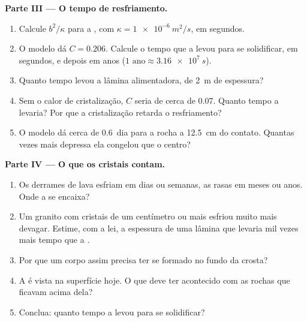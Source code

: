 \begin{problem}
\medskip
\noindent\textbf{Parte III --- O tempo de resfriamento.}
\begin{enumerate}[resume]
  \item Calcule $b^2/\kappa$ para a , com $\kappa = \qty{1e-6}{m^2/s}$,
        em segundos.
  \item O modelo dá $C = 0.206$. Calcule o tempo que a  levou para se solidificar, em
        segundos, e depois em anos ($\num{1}\text{ ano} \approx \qty{3.16e7}{s}$).
  \item Quanto tempo levou a lâmina alimentadora, de \qty{2}{m} de espessura?
  \item Sem o calor de cristalização, $C$ seria de cerca de $0.07$. Quanto
        tempo a  levaria? Por que a cristalização retarda o
        resfriamento?
  \item O modelo dá cerca de \num{0.6}~dia para a rocha a \qty{12.5}{cm} do
        contato. Quantas vezes mais depressa ela congelou que o centro?
\end{enumerate}

\medskip
\noindent\textbf{Parte IV --- O que os cristais contam.}
\begin{enumerate}[resume]
  \item Os derrames de lava esfriam em dias ou semanas, as  rasas
        em meses ou anos. Onde a  se encaixa?
  \item Um granito com cristais de um centímetro ou mais esfriou muito mais
        devagar. Estime, com a lei, a espessura de uma lâmina que levaria mil
        vezes mais tempo que a .
  \item Por que um corpo assim precisa ter se formado no fundo da crosta?
  \item A  é vista na superfície hoje. O que deve ter acontecido com
        as rochas que ficavam acima dela?
  \item Conclua: quanto tempo a  levou para se solidificar?
\end{enumerate}
\end{problem}
